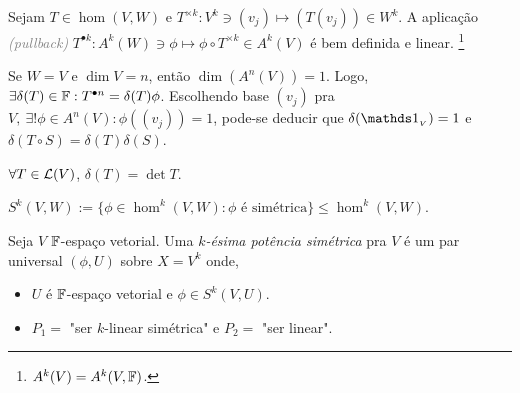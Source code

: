 \begin{lemma}
    Sejam \(T \in \hom(V,W)\) e \(T^{\times k}: V^k \ni (v_j) \mapsto (T(v_j)) \in W^k\). A aplicação \emph{\textcolor{gray}{(pullback)}} \(T^{\bullet k} : A^k(W) \ni \phi \mapsto  \phi \circ T^{\times k}  \in A^k(V)\) é bem definida e linear. \footnote{\(A^k(V) = A^k(V,\mathbb{F})\).}
\end{lemma}

\begin{note}
    Se \(W = V \) e \(\dim V =n \), então \(\dim (A^n(V)) = 1 \). Logo, \(\exists \delta(T) \in \mathbb{F} : T^{\bullet n} = \delta(T) \phi\). Escolhendo base \((v_j)\) pra \(V, \ \exists! \phi \in A^n(V): \phi((v_j)) =1\), pode-se deducir que \(\delta(\id_{_V})=1\) e \(\delta(T\circ S) = \delta(T) \delta(S)\). 
\end{note}


\begin{theorem}
    \(\forall T \in \mathcal{L}( V)\), \(\delta (T) = \det T\). 
\end{theorem}

\begin{definition}
    \centering
    \(S^k(V,W):= \{\phi \in \hom^k(V, W): \phi \text{ é simétrica}\} \leq \hom^k(V,W)\). 
\end{definition}

\begin{definition}
    Seja \(V\) \(\mathbb{F}\)-espaço vetorial. Uma $k$\emph{-ésima potência simétrica} pra \(V\) é um par universal \((\phi, U)\) sobre \(X =  V^k\) onde,   
    \vspace{-0.2cm}
    \begin{itemize}[left = 1cm]
        \item \(U\) é \(\mathbb{F}\)-espaço vetorial e \(\phi \in S^k(V, U)\). 
        \item \(P_1 = \) "ser $k$-linear simétrica" e \(P_2 = \) "ser linear".
    \end{itemize}  
\end{definition}

